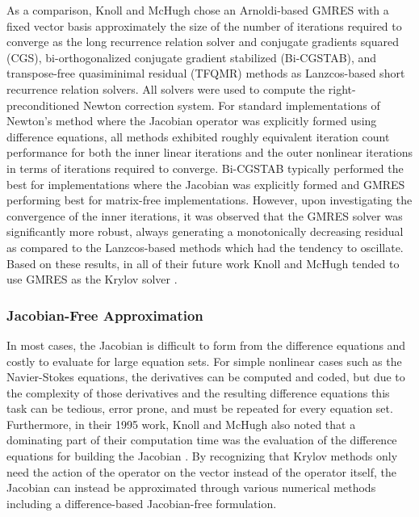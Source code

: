 As a comparison, Knoll and McHugh chose an Arnoldi-based GMRES with a
fixed vector basis approximately the size of the number of iterations
required to converge as the long recurrence relation solver and
conjugate gradients squared (CGS), bi-orthogonalized conjugate
gradient stabilized (Bi-CGSTAB), and transpose-free quasiminimal
residual (TFQMR) methods as Lanzcos-based short recurrence relation
solvers. All solvers were used to compute the right-preconditioned
Newton correction system. For standard implementations of Newton's
method where the Jacobian operator was explicitly formed using
difference equations, all methods exhibited roughly equivalent
iteration count performance for both the inner linear iterations and
the outer nonlinear iterations in terms of iterations required to
converge. Bi-CGSTAB typically performed the best for
implementations where the Jacobian was explicitly formed and GMRES
performing best for matrix-free implementations. However, upon
investigating the convergence of the inner iterations, it was observed
that the GMRES solver was significantly more robust, always generating
a monotonically decreasing residual as compared to the Lanzcos-based
methods which had the tendency to oscillate. Based on these results,
in all of their future work Knoll and McHugh tended to use GMRES as
the Krylov solver \citep{knoll_jacobian-free_2004}.

\subsubsection{Jacobian-Free Approximation}
\label{subsubsec:jacobian_free_approximation}
In most cases, the Jacobian is difficult to form from the difference
equations and costly to evaluate for large equation sets. For simple
nonlinear cases such as the Navier-Stokes equations, the derivatives
can be computed and coded, but due to the complexity of those
derivatives and the resulting difference equations this task can be
tedious, error prone, and must be repeated for every equation
set. Furthermore, in their 1995 work, Knoll and McHugh also noted that
a dominating part of their computation time was the evaluation of the
difference equations for building the Jacobian
\citep{knoll_newton-krylov_1995}. By recognizing that Krylov methods
only need the action of the operator on the vector instead of the
operator itself, the Jacobian can instead be approximated through
various numerical methods including a difference-based Jacobian-free
formulation. 


